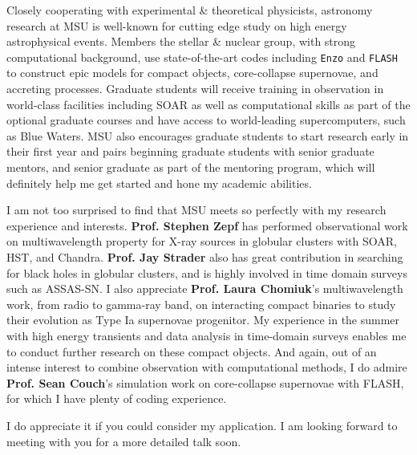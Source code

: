 \documentclass[11pt, a4paper]{awesome-cv} %
\begin{document}
\makecvheader %



\begin{cvletter}





Closely cooperating with experimental \& theoretical physicists, astronomy research at MSU is well-known for cutting edge study on high energy astrophysical events. Members the stellar \& nuclear group, with strong computational background, use state-of-the-art codes including \texttt{Enzo} and \texttt{FLASH} to construct epic models for compact objects, core-collapse supernovae, and accreting processes. Graduate students will receive training in observation in world-class facilities including SOAR as well as computational skills as part of the optional graduate courses and have access to world-leading supercomputers, such as Blue Waters. MSU also encourages graduate students to start research early in their first year and pairs beginning graduate students with senior graduate mentors, and senior graduate as part of the mentoring program, which will definitely help me get started and hone my academic abilities.

I am not too surprised to find that MSU meets so perfectly with my research experience and interests. \textbf{Prof. Stephen Zepf} has performed observational work on multiwavelength property for X-ray sources in globular clusters with SOAR, HST, and Chandra. \textbf{Prof. Jay Strader} also has great contribution in searching for black holes in globular clusters, and is highly involved in time domain surveys such as ASSAS-SN. I also appreciate \textbf{Prof. Laura Chomiuk}’s multiwavelength work, from radio to gamma-ray band, on interacting compact binaries to study their evolution as Type Ia supernovae progenitor. My experience in the summer with high energy transients and data analysis in time-domain surveys enables me to conduct further research on these compact objects. And again, out of an intense interest to combine observation with computational methods, I do admire \textbf{Prof. Sean Couch}’s simulation work on core-collapse supernovae with FLASH, for which I have plenty of coding experience.


I do appreciate it if you could consider my application. I am looking forward to meeting with you for a more detailed talk soon.

\end{cvletter}


\end{document}
